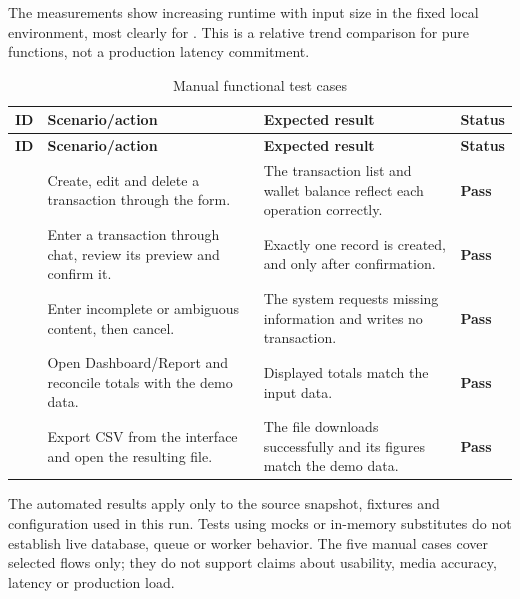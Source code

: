 The measurements show increasing runtime with input size in the fixed local environment, most clearly for . This is a relative trend comparison for pure functions, not a production latency commitment.
\begin{longtable}{@{}L{1.5cm}L{4.6cm}L{6.5cm}C{1.5cm}@{}}
  \caption{Manual functional test cases}\label{tab:manual-test-cases}\\
  \toprule
  \textbf{ID} & \textbf{Scenario/action} & \textbf{Expected result} & \textbf{Status} \\
  \midrule
  \endfirsthead
  \toprule
  \textbf{ID} & \textbf{Scenario/action} & \textbf{Expected result} & \textbf{Status} \\
  \midrule
  \endhead
   & Create, edit and delete a transaction through the form. & The transaction list and wallet balance reflect each operation correctly. & \textbf{Pass} \\
   & Enter a transaction through chat, review its preview and confirm it. & Exactly one record is created, and only after confirmation. & \textbf{Pass} \\
   & Enter incomplete or ambiguous content, then cancel. & The system requests missing information and writes no transaction. & \textbf{Pass} \\
   & Open Dashboard/Report and reconcile totals with the demo data. & Displayed totals match the input data. & \textbf{Pass} \\
   & Export CSV from the interface and open the resulting file. & The file downloads successfully and its figures match the demo data. & \textbf{Pass} \\
  \bottomrule
\end{longtable}

The automated results apply only to the source snapshot, fixtures and configuration used in this run. Tests using mocks or in-memory substitutes do not establish live database, queue or worker behavior. The five manual cases cover selected flows only; they do not support claims about usability, media accuracy, latency or production load.
